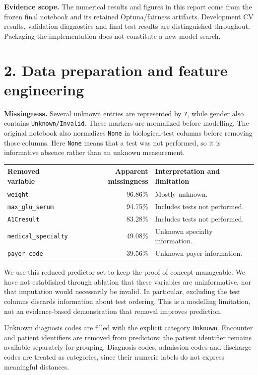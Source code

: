 \documentclass[11pt,a4paper]{article}
\newcommand{\pageheading}[2]{\section*{\color{ink}#1. #2}}
\newcommand{\nextpage}{\clearpage}
\begin{document}
\textbf{Evidence scope.} The numerical results and figures in this report come from the frozen final notebook and its retained Optuna/fairness artifacts. Development CV results, validation diagnostics and final test results are distinguished throughout. Packaging the implementation does not constitute a new model search.

\nextpage
\pageheading{2}{Data preparation and feature engineering}
\textbf{Missingness.} Several unknown entries are represented by \texttt{?}, while gender also contains \texttt{Unknown/Invalid}. These markers are normalized before modelling. The original notebook also normalizes \texttt{None} in biological-test columns before removing those columns. Here \texttt{None} means that a test was not performed, so it is informative absence rather than an unknown measurement.

\begin{center}\begin{tabular}{lrp{72mm}}\toprule
Removed variable & Apparent missingness & Interpretation and limitation\\\midrule
\texttt{weight} & 96.86\% & Mostly unknown.\\
\texttt{max\_glu\_serum} & 94.75\% & Includes tests not performed.\\
\texttt{A1Cresult} & 83.28\% & Includes tests not performed.\\
\texttt{medical\_specialty} & 49.08\% & Unknown specialty information.\\
\texttt{payer\_code} & 39.56\% & Unknown payer information.\\\bottomrule
\end{tabular}\end{center}
We use this reduced predictor set to keep the proof of concept manageable. We have not established through ablation that these variables are uninformative, nor that imputation would necessarily be invalid. In particular, excluding the test columns discards information about test ordering. This is a modelling limitation, not an evidence-based demonstration that removal improves prediction.

Unknown diagnosis codes are filled with the explicit category \texttt{Unknown}. Encounter and patient identifiers are removed from predictors; the patient identifier remains available separately for grouping. Diagnosis codes, admission codes and discharge codes are treated as categories, since their numeric labels do not express meaningful distances.
\end{document}
